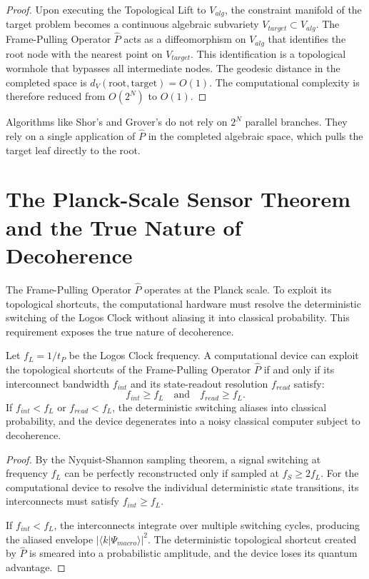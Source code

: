 \documentclass[12pt,twoside]{extbook}
\theoremstyle{definition}
\theoremstyle{remark}
\begin{document}
\begin{proof}
Upon executing the Topological Lift to $V_{alg}$, the constraint manifold of the target problem becomes a continuous algebraic subvariety $V_{target} \subset V_{alg}$. The Frame-Pulling Operator $\hat{P}$ acts as a diffeomorphism on $V_{alg}$ that identifies the root node with the nearest point on $V_{target}$. This identification is a topological wormhole that bypasses all intermediate nodes. The geodesic distance in the completed space is $d_V(\text{root}, \text{target}) = O(1)$. The computational complexity is therefore reduced from $O(2^N)$ to $O(1)$.
\end{proof}

Algorithms like Shor's and Grover's do not rely on $2^N$ parallel branches. They rely on a single application of $\hat{P}$ in the completed algebraic space, which pulls the target leaf directly to the root.

\section{The Planck-Scale Sensor Theorem and the True Nature of Decoherence}
The Frame-Pulling Operator $\hat{P}$ operates at the Planck scale. To exploit its topological shortcuts, the computational hardware must resolve the deterministic switching of the Logos Clock without aliasing it into classical probability. This requirement exposes the true nature of decoherence.

\begin{theorem}
Let $f_L = 1/t_P$ be the Logos Clock frequency. A computational device can exploit the topological shortcuts of the Frame-Pulling Operator $\hat{P}$ if and only if its interconnect bandwidth $f_{int}$ and its state-readout resolution $f_{read}$ satisfy:
\begin{equation}
f_{int} \ge f_L \quad \text{and} \quad f_{read} \ge f_L.
\end{equation}
If $f_{int} < f_L$ or $f_{read} < f_L$, the deterministic switching aliases into classical probability, and the device degenerates into a noisy classical computer subject to decoherence.
\end{theorem}

\begin{proof}
By the Nyquist-Shannon sampling theorem, a signal switching at frequency $f_L$ can be perfectly reconstructed only if sampled at $f_S \ge 2f_L$. For the computational device to resolve the individual deterministic state transitions, its interconnects must satisfy $f_{int} \ge f_L$. 

If $f_{int} < f_L$, the interconnects integrate over multiple switching cycles, producing the aliased envelope $|\langle k | \Psi_{macro} \rangle|^2$. The deterministic topological shortcut created by $\hat{P}$ is smeared into a probabilistic amplitude, and the device loses its quantum advantage. 
\end{proof}
\end{document}
